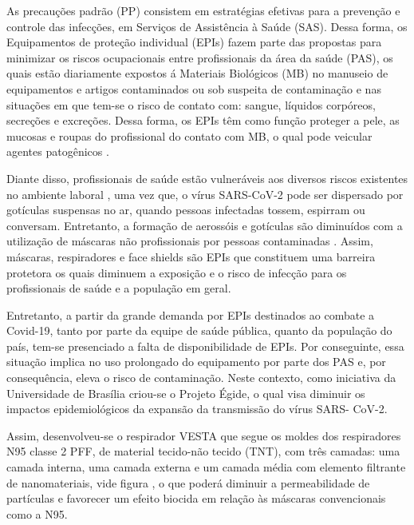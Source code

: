 As precauções padrão (PP) consistem em estratégias efetivas para a prevenção e controle das infecções, em Serviços de Assistência à Saúde (SAS). Dessa forma, os Equipamentos de proteção individual (EPIs) fazem parte das propostas para minimizar os riscos ocupacionais  entre profissionais da área da saúde (PAS), os quais estão diariamente expostos á Materiais Biológicos (MB) no manuseio de equipamentos e artigos contaminados ou sob suspeita de contaminação e nas situações em que tem-se o risco de contato com: sangue, líquidos corpóreos, secreções e excreções. Dessa forma, os EPIs têm como função proteger a pele, as mucosas e roupas do profissional do contato com MB, o qual pode veicular agentes patogênicos \cite{De2006}.

Diante disso, profissionais de saúde estão vulneráveis aos diversos riscos existentes no ambiente laboral \cite{Ribeiro2010}, uma vez que, o vírus SARS-CoV-2 pode ser dispersado por gotículas suspensas no ar, quando pessoas infectadas tossem, espirram ou conversam. Entretanto, a formação de aerossóis e gotículas são diminuídos com a utilização de máscaras não profissionais por pessoas contaminadas \cite{girardi2020}. Assim, máscaras, respiradores e face shields são EPIs que constituem uma barreira protetora  os quais diminuem a exposição e o risco de infecção para os profissionais de saúde e a população em geral. 

Entretanto, a partir da grande demanda por EPIs destinados ao combate a Covid-19, tanto por parte da equipe de saúde pública, quanto da população do país, tem-se presenciado a falta de disponibilidade de EPIs. Por conseguinte, essa situação implica no uso prolongado do equipamento por parte dos PAS e, por consequência, eleva o risco de contaminação. Neste contexto, como iniciativa da Universidade de Brasília criou-se o Projeto Égide,  o qual visa diminuir os impactos epidemiológicos da expansão da transmissão do vírus SARS- CoV-2. 

Assim,  desenvolveu-se o respirador VESTA que segue os moldes dos respiradores N95 classe 2 PFF, de material tecido-não tecido (TNT), com três camadas: uma camada interna, uma camada externa e um camada média com elemento filtrante de nanomateriais, vide figura , o que poderá diminuir a permeabilidade de partículas e favorecer um efeito biocida em relação às máscaras convencionais como a N95. 

